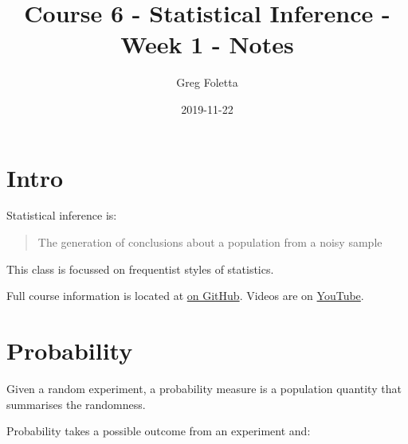 \documentclass[]{article}
\title{Course 6 - Statistical Inference - Week 1 - Notes}
\author{Greg Foletta}
\date{2019-11-22}
\begin{document}
\maketitle

\hypertarget{intro}{%
\section{Intro}\label{intro}}

Statistical inference is:

\begin{quote}
The generation of conclusions about a population from a noisy sample
\end{quote}

This class is focussed on frequentist styles of statistics.

Full course information is located at
\href{https://github.com/bcaffo/courses/tree/master/06_StatisticalInference}{on
GitHub}. Videos are on
\href{https://www.youtube.com/playlist?list=PLpl-gQkQivXiBmGyzLrUjzsblmQsLtkzJ}{YouTube}.

\hypertarget{probability}{%
\section{Probability}\label{probability}}

Given a random experiment, a probability measure is a population
quantity that summarises the randomness.

Probability takes a possible outcome from an experiment and:
\end{document}
